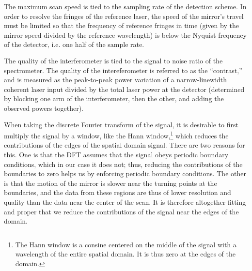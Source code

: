 \documentclass[12pt]{puthesis}
\begin{document}
The maximum scan speed is tied to the sampling rate of the detection scheme. In order to resolve the fringes of the reference laser, the speed of the mirror's travel must be limited so that the frequency of reference fringes in time (given by the mirror speed divided by the reference wavelength) is below the Nyquist frequency of the detector, i.e. one half of the sample rate.

The quality of the interferometer is tied to the signal to noise ratio of the spectrometer. The quality of the intereferometer is referred to as the ``contrast,'' and is measured as the peak-to-peak power variation of a narrow-linewidth coherent laser input divided by the total laser power at the detector (determined by blocking one arm of the interferometer, then the other, and adding the observed powers together).

When taking the discrete Fourier transform of the signal, it is desirable to first multiply the signal by a window, like the Hann window,\footnote{The Hann window is a consine centered on the middle of the signal with a wavelength of the entire spatial domain. It is thus zero at the edges of the domain.} which reduces the contributions of the edges of the spatial domain signal. There are two reasons for this. One is that the DFT assumes that the signal obeys periodic boundary conditions, which in our case it does not; thus, reducing the contributions of the boundaries to zero helps us by enforcing periodic boundary conditions. The other is that the motion of the mirror is slower near the turning points at the boundaries, and the data from these regions are thus of lower resolution and quality than the data near the center of the scan. It is therefore altogether fitting and proper that we reduce the contributions of the signal near the edges of the domain.




\end{document}
